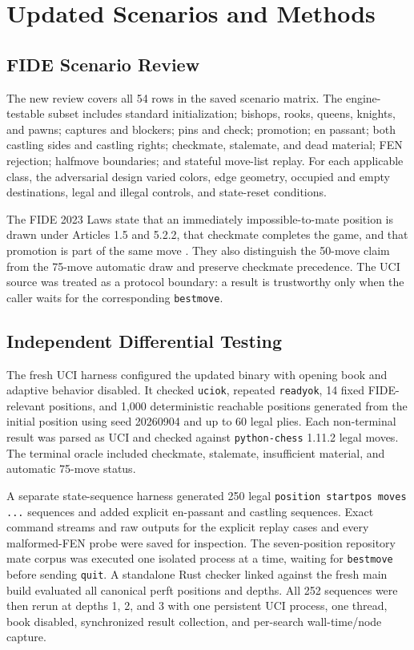 \documentclass[conference]{IEEEtran}
\begin{document}
\section{Updated Scenarios and Methods}
\subsection{FIDE Scenario Review}
The new review covers all 54 rows in the saved scenario matrix. The engine-testable subset includes standard initialization; bishops, rooks, queens, knights, and pawns; captures and blockers; pins and check; promotion; en passant; both castling sides and castling rights; checkmate, stalemate, and dead material; FEN rejection; halfmove boundaries; and stateful move-list replay. For each applicable class, the adversarial design varied colors, edge geometry, occupied and empty destinations, legal and illegal controls, and state-reset conditions.

The FIDE 2023 Laws state that an immediately impossible-to-mate position is drawn under Articles 1.5 and 5.2.2, that checkmate completes the game, and that promotion is part of the same move \cite{fide}. They also distinguish the 50-move claim from the 75-move automatic draw and preserve checkmate precedence. The UCI source was treated as a protocol boundary: a result is trustworthy only when the caller waits for the corresponding \texttt{bestmove}.

\subsection{Independent Differential Testing}
The fresh UCI harness configured the updated binary with opening book and adaptive behavior disabled. It checked \texttt{uciok}, repeated \texttt{readyok}, 14 fixed FIDE-relevant positions, and 1,000 deterministic reachable positions generated from the initial position using seed 20260904 and up to 60 legal plies. Each non-terminal result was parsed as UCI and checked against \texttt{python-chess} 1.11.2 legal moves. The terminal oracle included checkmate, stalemate, insufficient material, and automatic 75-move status.

A separate state-sequence harness generated 250 legal \texttt{position startpos moves ...} sequences and added explicit en-passant and castling sequences. Exact command streams and raw outputs for the explicit replay cases and every malformed-FEN probe were saved for inspection. The seven-position repository mate corpus was executed one isolated process at a time, waiting for \texttt{bestmove} before sending \texttt{quit}. A standalone Rust checker linked against the fresh main build evaluated all canonical perft positions and depths. All 252 sequences were then rerun at depths 1, 2, and 3 with one persistent UCI process, one thread, book disabled, synchronized result collection, and per-search wall-time/node capture.
\end{document}
